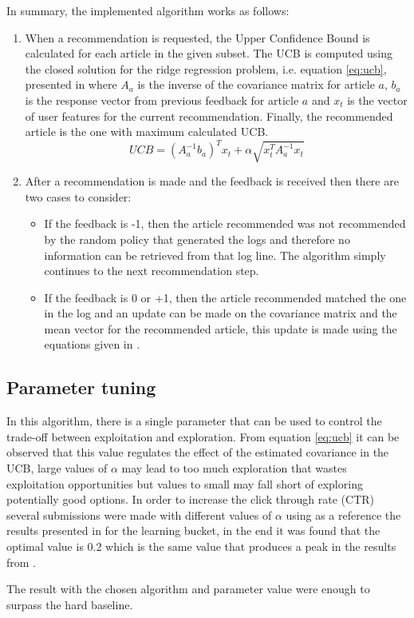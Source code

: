 \documentclass[a4paper, 11pt]{article}
\begin{document}
In summary, the implemented algorithm works as follows:

\begin{enumerate}
	\item When a recommendation is requested, the Upper Confidence Bound is calculated for each article in the given subset. The UCB is computed using the closed solution for the ridge regression problem, i.e. equation \ref{eq:ucb}, presented in \cite{li2010contextual} where $A_a$ is the inverse of the covariance matrix for article $a$, $b_a$ is the response vector from previous feedback for article $a$ and $x_t$ is the vector of user features for the current recommendation. Finally, the recommended article is the one with maximum calculated UCB.
	\begin{equation}
		\label{eq:ucb}
		UCB = (A^{-1}_{a}b_{a})^{T}x_{t} + \alpha\sqrt{x_{t}^{T}A^{-1}_{a}x_{t}}
	\end{equation}
	\item After a recommendation is made and the feedback is received then there are two cases to consider:
		\begin{itemize}
			\item If the feedback is -1, then the article recommended was not recommended by the random policy that generated the logs and therefore no information can be retrieved from that log line. The algorithm simply continues to the next recommendation step.
			\item If the feedback is 0 or +1, then the article recommended matched the one in the log and an update can be made on the covariance matrix and the mean vector for the recommended article, this update is made using the equations given in \cite{li2010contextual}.
		\end{itemize}
\end{enumerate}

\subsection{Parameter tuning}

In this algorithm, there is a single parameter that can be used to control the trade-off between exploitation and exploration. From equation \ref{eq:ucb} it can be observed that this value regulates the effect of the estimated covariance in the UCB, large values of $\alpha$ may lead to too much exploration that wastes exploitation opportunities but values to small may fall short of exploring potentially good options. In order to increase the click through rate (CTR) several submissions were made with different values of $\alpha$ using as a reference the results presented in \cite{li2010contextual} for the learning bucket, in the end it was found that the optimal value is 0.2 which is the same value that produces a peak in the results from \cite{li2010contextual}.

The result with the chosen algorithm and parameter value were enough to surpass the hard baseline.



\end{document}
